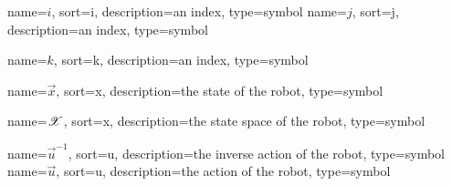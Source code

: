 	{%
		name=\ensuremath{i},
		sort=i,
		description=an index,
		type=symbol
	}
	\newcommand{\indexi}{\gls{sym:indexi}}
	{%
		name=\ensuremath{j},
		sort=j,
		description=an index,
		type=symbol
	}
	\newcommand{\indexj}{\gls{sym:indexj}}

	{%
		name=\ensuremath{k},
		sort=k,
		description=an index,
		type=symbol
	}
	\newcommand{\indexk}{\gls{sym:indexk}}

	{%
		name=\ensuremath{\vec{x}},
		sort=x,
		description=the state  of the robot,
		type=symbol
	}
	\newcommand{\state}{\gls{sym:state}}

	{%
		name=\ensuremath{\vecspace{X}},
		sort=x,
		description=the state space of the robot,
		type=symbol
	}
	\newcommand{\statespace}{\gls{sym:statespace}}

	\newcommand{\phasespace}{\statespace}

	{%
		name=\ensuremath{\vec{u}^{-1}},
		sort=u,
		description=the inverse action  of the robot,
		type=symbol
	}
	\newcommand{\invaction}{\gls{sym:invaction}}
	{%
		name=\ensuremath{\vec{u}},
		sort=u,
		description=the action  of the robot,
		type=symbol
	}
	\newcommand{\action}{\gls{sym:action}}

